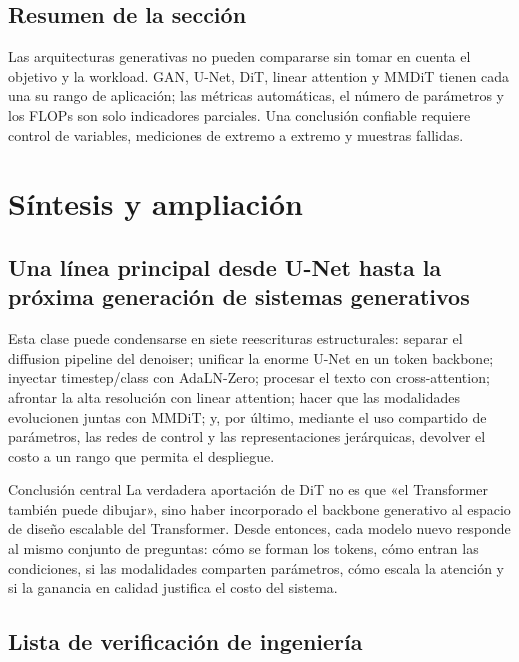 \documentclass[a4paper]{article}
\begin{document}
\subsection{Resumen de la sección}

Las arquitecturas generativas no pueden compararse sin tomar en cuenta el objetivo y la workload. GAN, U-Net, DiT, linear attention y MMDiT tienen cada una su rango de aplicación; las métricas automáticas, el número de parámetros y los FLOPs son solo indicadores parciales. Una conclusión confiable requiere control de variables, mediciones de extremo a extremo y muestras fallidas.
\section{Síntesis y ampliación}

\subsection{Una línea principal desde U-Net hasta la próxima generación de sistemas generativos}

Esta clase puede condensarse en siete reescrituras estructurales: separar el diffusion pipeline del denoiser; unificar la enorme U-Net en un token backbone; inyectar timestep/class con AdaLN-Zero; procesar el texto con cross-attention; afrontar la alta resolución con linear attention; hacer que las modalidades evolucionen juntas con MMDiT; y, por último, mediante el uso compartido de parámetros, las redes de control y las representaciones jerárquicas, devolver el costo a un rango que permita el despliegue.

\begin{importantbox}{Conclusión central}
La verdadera aportación de DiT no es que «el Transformer también puede dibujar», sino haber incorporado el backbone generativo al espacio de diseño escalable del Transformer. Desde entonces, cada modelo nuevo responde al mismo conjunto de preguntas: cómo se forman los tokens, cómo entran las condiciones, si las modalidades comparten parámetros, cómo escala la atención y si la ganancia en calidad justifica el costo del sistema.
\end{importantbox}

\subsection{Lista de verificación de ingeniería}
\end{document}
